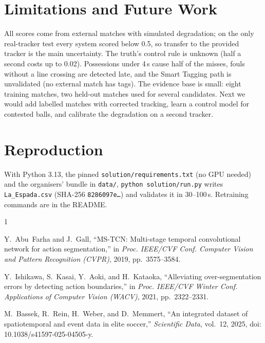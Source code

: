 \documentclass[conference]{IEEEtran}
\begin{document}
\section{Limitations and Future Work}

All scores come from external matches with simulated degradation; on the only real-tracker test every system scored
below 0.5, so transfer to the provided tracker is the main uncertainty. The truth's control rule is unknown (half a
second costs up to 0.02). Possessions under 4\,s cause half of the misses, fouls without a line crossing are detected
late, and the Smart Tagging path is unvalidated (no external match has tags). The evidence base is small: eight
training matches, two held-out matches used for several candidates. Next we would add labelled matches with
corrected tracking, learn a control model for contested balls, and calibrate the degradation on a second tracker.

\section{Reproduction}

{\raggedright
With Python 3.13, the pinned \texttt{solution/\allowbreak requirements.txt} (no GPU needed) and the organisers'
bundle in \texttt{data/}, \texttt{python solution/run.py} writes \texttt{La\_Espada.csv} (SHA-256
\texttt{8286097e\ldots}) and validates it in 30--100\,s. Retraining commands are in the README.\par}


\begin{thebibliography}{1}

Y.~Abu~Farha and J.~Gall, ``MS-TCN: Multi-stage temporal convolutional network for action segmentation,'' in
\emph{Proc. IEEE/CVF Conf. Computer Vision and Pattern Recognition (CVPR)}, 2019, pp.~3575--3584.

Y.~Ishikawa, S.~Kasai, Y.~Aoki, and H.~Kataoka, ``Alleviating over-segmentation errors by detecting action
boundaries,'' in \emph{Proc. IEEE/CVF Winter Conf. Applications of Computer Vision (WACV)}, 2021, pp.~2322--2331.

M.~Bassek, R.~Rein, H.~Weber, and D.~Memmert, ``An integrated dataset of spatiotemporal and event data in elite
soccer,'' \emph{Scientific Data}, vol.~12, 2025, doi: 10.1038/s41597-025-04505-y.

\end{thebibliography}
\end{document}
